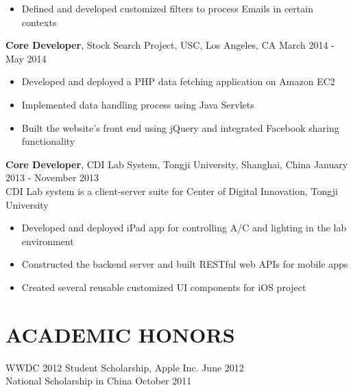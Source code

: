 \documentclass[line, overlapped]{res}
\begin{document}
\begin{resume}
\begin{itemize}
 \item Defined and developed customized filters to process Emails in certain contexts
  
 \end{itemize}
 
 \textbf{Core Developer}, Stock Search Project, USC, Los Angeles, CA \hfill  March 2014 - May 2014
\begin{itemize} \itemsep -2pt %
	
  \item Developed and deployed a PHP data fetching application on Amazon EC2

  \item Implemented data handling process using Java Servlets
  
  \item Built the website's front end using jQuery and integrated Facebook sharing functionality

\end{itemize}

\textbf{Core Developer}, CDI Lab System, Tongji University, Shanghai, China \hfill January 2013 - November 2013\\
CDI Lab system is a client-server suite for Center of Digital Innovation, Tongji University
\begin{itemize} \itemsep -2pt %
  
  \item Developed and deployed iPad app for controlling A/C and lighting in the lab environment
  
  \item Constructed the backend server and built RESTful web APIs for mobile apps

  \item Created several reusable customized UI components for iOS project

\end{itemize}

\section{ACADEMIC HONORS}
WWDC 2012 Student Scholarship, Apple Inc. \hfill June 2012\\
National Scholarship in China \hfill October 2011\\

\end{resume}
\end{document}
